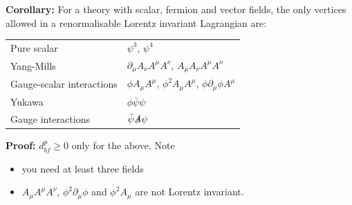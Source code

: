 \documentclass[a4paper,12pt]{article}
\begin{document}
\newline
\textbf{Corollary: } For a theory with scalar, fermion and vector fields, the only vertices allowed in a renormalisable Lorentz invariant Lagrangian are:
\begin{table}[h!]
\begin{tabular}{ll}
 Pure scalar & $\psi^3$, $\psi^4$  \\
 Yang-Mills &  $\partial_\mu A_\nu A^\mu A^\nu$, $A_\mu A_\nu A^\mu A^\nu$ \\
 Gauge-scalar interactions & $\phi A_\mu A^\mu$, $\phi^2 A_\mu A^\mu$, $\phi \partial_\mu \phi A^\mu$ \\
 Yukawa &  $\phi \bar{\psi} \psi$ \\
 Gauge interactions & $\bar{\psi} \slashed{A} \psi$
\end{tabular}
\end{table}
\newline
\textbf{Proof: } $d^p_{bf} \geq 0$ only for the above. Note
\begin{itemize}
\item you need at least three fields
\item $A_\mu A^\mu A^\nu$, $\phi^2 \partial_\mu \phi$ and $\phi^2 A_\mu$ are not Lorentz invariant.
\end{itemize}
%
\end{document}
